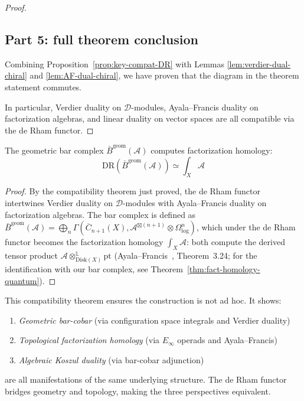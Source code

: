 \begin{proof}
\subsection*{Part 5: full theorem conclusion}

Combining Proposition~\ref{prop:key-compat-DR} with Lemmas \ref{lem:verdier-dual-chiral} and \ref{lem:AF-dual-chiral}, we have proven that the diagram in the theorem statement commutes.

In particular, Verdier duality on $\mathcal{D}$-modules, Ayala--Francis duality on factorization algebras, and linear duality on vector spaces are all compatible via the de Rham functor.
\end{proof}

\begin{corollary}\label{cor:bar-is-fh}
The geometric bar complex $\bar{B}^{\text{geom}}(\mathcal{A})$ computes factorization homology:
\[\text{DR}(\bar{B}^{\text{geom}}(\mathcal{A})) \simeq \int_X \mathcal{A}\]
\end{corollary}

\begin{proof}
By the compatibility theorem just proved, the de Rham functor intertwines Verdier duality on $\mathcal{D}$-modules with Ayala--Francis duality on factorization algebras.  The bar complex is defined as $\bar{B}^{\mathrm{geom}}(\mathcal{A}) = \bigoplus_n \Gamma(\overline{C}_{n+1}(X), \mathcal{A}^{\boxtimes(n+1)} \otimes \Omega^n_{\log})$, which under the de Rham functor becomes the factorization homology $\int_X \mathcal{A}$: both compute the derived tensor product $\mathcal{A} \otimes^{\mathbb{L}}_{\mathrm{Disk}(X)} \mathrm{pt}$ (Ayala--Francis~\cite{AF15}, Theorem~3.24; for the identification with our bar complex, see Theorem~\ref{thm:fact-homology-quantum}).
\end{proof}

\begin{remark}\label{rem:why-verdier-AF-matters}
This compatibility theorem ensures the construction is not ad hoc. It shows:

\begin{enumerate}
\item \emph{Geometric bar-cobar} (via configuration space integrals and Verdier duality)
\item \emph{Topological factorization homology} (via $E_\infty$ operads and Ayala--Francis)
\item \emph{Algebraic Koszul duality} (via bar-cobar adjunction)
\end{enumerate}

are all manifestations of the same underlying structure. The de Rham functor bridges geometry and topology, making the three perspectives equivalent.
\end{remark}

